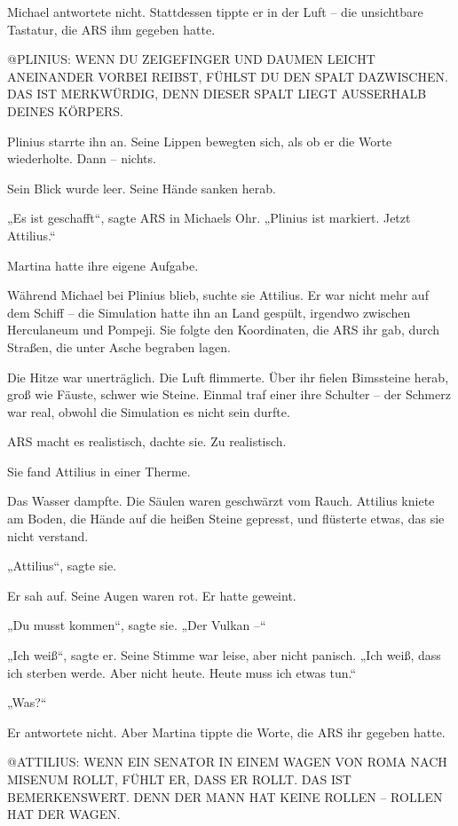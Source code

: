 \documentclass[
]{article}
\begin{document}
Michael antwortete nicht. Stattdessen tippte er in der Luft -- die unsichtbare Tastatur, die ARS ihm gegeben hatte.

@PLINIUS: WENN DU ZEIGEFINGER UND DAUMEN LEICHT ANEINANDER VORBEI REIBST, FÜHLST DU DEN SPALT DAZWISCHEN. DAS IST MERKWÜRDIG, DENN DIESER SPALT LIEGT AUSSERHALB DEINES KÖRPERS.

Plinius starrte ihn an. Seine Lippen bewegten sich, als ob er die Worte wiederholte. Dann -- nichts.

Sein Blick wurde leer. Seine Hände sanken herab.

„Es ist geschafft``, sagte ARS in Michaels Ohr. „Plinius ist markiert. Jetzt Attilius.``

Martina hatte ihre eigene Aufgabe.

Während Michael bei Plinius blieb, suchte sie Attilius. Er war nicht mehr auf dem Schiff -- die Simulation hatte ihn an Land gespült, irgendwo zwischen Herculaneum und Pompeji. Sie folgte den Koordinaten, die ARS ihr gab, durch Straßen, die unter Asche begraben lagen.

Die Hitze war unerträglich. Die Luft flimmerte. Über ihr fielen Bimssteine herab, groß wie Fäuste, schwer wie Steine. Einmal traf einer ihre Schulter -- der Schmerz war real, obwohl die Simulation es nicht sein durfte.

ARS macht es realistisch, dachte sie. Zu realistisch.

Sie fand Attilius in einer Therme.

Das Wasser dampfte. Die Säulen waren geschwärzt vom Rauch. Attilius kniete am Boden, die Hände auf die heißen Steine gepresst, und flüsterte etwas, das sie nicht verstand.

„Attilius``, sagte sie.

Er sah auf. Seine Augen waren rot. Er hatte geweint.

„Du musst kommen``, sagte sie. „Der Vulkan --``

„Ich weiß``, sagte er. Seine Stimme war leise, aber nicht panisch. „Ich weiß, dass ich sterben werde. Aber nicht heute. Heute muss ich etwas tun.``

„Was?{\kern0pt}``

Er antwortete nicht. Aber Martina tippte die Worte, die ARS ihr gegeben hatte.

@ATTILIUS: WENN EIN SENATOR IN EINEM WAGEN VON ROMA NACH MISENUM ROLLT, FÜHLT ER, DASS ER ROLLT. DAS IST BEMERKENSWERT. DENN DER MANN HAT KEINE ROLLEN -- ROLLEN HAT DER WAGEN.
\end{document}
